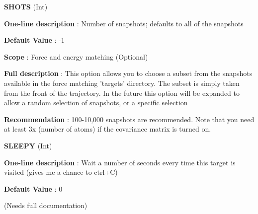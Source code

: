 \begin{DoxyItemize}
\item {\bfseries  \-S\-H\-O\-T\-S } (\-Int) \par
{\bfseries  \-One-\/line description }\-: \-Number of snapshots; defaults to all of the snapshots \par
{\bfseries  \-Default \-Value }\-: -\/1 \par
{\bfseries  \-Scope }\-: \-Force and energy matching (\-Optional) \par
{\bfseries  \-Full description }\-: \-This option allows you to choose a subset from the snapshots available in the force matching 'targets' directory. \-The subset is simply taken from the front of the trajectory. \-In the future this option will be expanded to allow a random selection of snapshots, or a specific selection \par
{\bfseries  \-Recommendation }\-: 100-\/10,000 snapshots are recommended. \-Note that you need at least 3x (number of atoms) if the covariance matrix is turned on.\end{DoxyItemize}
\begin{DoxyItemize}
\item {\bfseries  \-S\-L\-E\-E\-P\-Y } (\-Int) \par
{\bfseries  \-One-\/line description }\-: \-Wait a number of seconds every time this target is visited (gives me a chance to ctrl+\-C) \par
{\bfseries  \-Default \-Value }\-: 0 \par
(\-Needs full documentation)\end{DoxyItemize}
